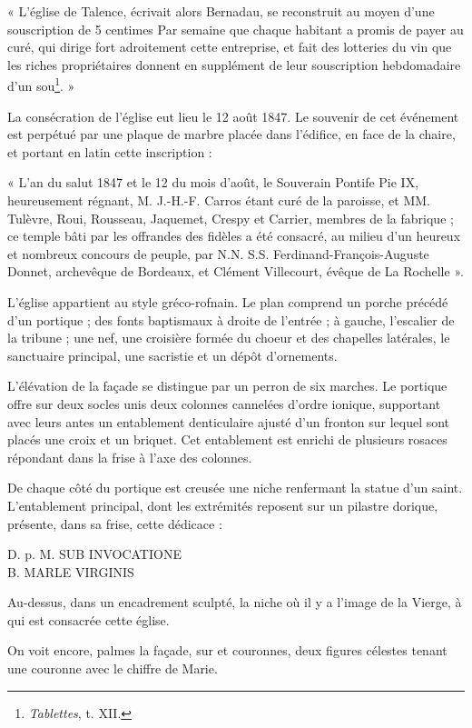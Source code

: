 « L'église de Talence, écrivait alors Bernadau, se reconstruit au moyen d'une souscription de 5 centimes Par semaine que chaque habitant a promis de payer au curé, qui dirige fort adroitement cette entreprise, et fait des lotteries du vin que les riches propriétaires donnent en supplément de leur souscription hebdomadaire d'un sou\footnote{\textit{Tablettes}, t. XII.}. »

La consécration de l'église eut lieu le 12 août 1847. Le souvenir de cet événement est perpétué par une plaque de marbre placée dans l'édifice, en face de la chaire, et portant en latin cette inscription :

« L'an du salut 1847 et le 12 du mois d'août, le Souverain Pontife Pie IX, heureusement régnant, M. J.-H.-F. Carros étant curé de la paroisse, et MM. Tulèvre, Roui, Rousseau, Jaquemet, Crespy et Carrier, membres de la fabrique ; ce temple bâti par les offrandes des fidèles a été consacré, au milieu d'un heureux et nombreux concours de peuple, par N.N. S.S. Ferdinand-François-Auguste Donnet, archevêque de Bordeaux, et Clément Villecourt, évêque de La Rochelle ».

L'église appartient au style gréco-rofnain. Le plan comprend un porche précédé d'un portique ; des fonts baptismaux à droite de l'entrée ; à gauche, l'escalier de la tribune ; une nef, une croisière formée du choeur et des chapelles latérales, le sanctuaire principal, une sacristie et un dépôt d'ornements.

L'élévation de la façade se distingue par un perron de six marches. Le portique offre sur deux socles unis deux colonnes cannelées d'ordre ionique, supportant avec leurs antes un entablement denticulaire ajusté d'un fronton sur lequel sont placés une croix et un briquet. Cet entablement est enrichi de plusieurs rosaces répondant dans la frise à l'axe des colonnes.

De chaque côté du portique est creusée une niche renfermant la statue d'un saint. L'entablement principal, dont les extrémités reposent sur un pilastre dorique, présente, dans sa frise, cette dédicace :

\begin{center}
D. p. M. SUB INVOCATIONE\\
B. MARLE VIRGINIS
\end{center}

Au-dessus, dans un encadrement sculpté, la niche où il y a l'image de la Vierge, à qui est consacrée cette église.

On voit encore, palmes la façade, sur et couronnes, deux figures célestes tenant une couronne avec le chiffre de Marie.

